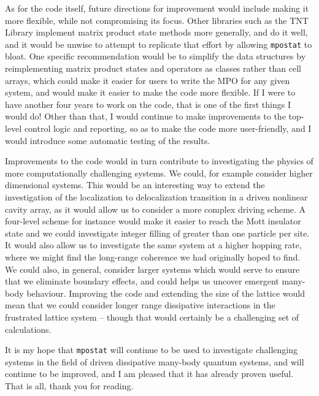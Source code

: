 As for the code itself, future directions for improvement would include making it more flexible, while not compromising its focus. Other libraries such as the TNT Library \cite{TNTlib,Al-Assam2017} implement matrix product state methods more generally, and do it well, and it would be unwise to attempt to replicate that effort by allowing \lstinline$mpostat$ to bloat. One specific recommendation would be to simplify the data structures by reimplementing matrix product states and operators as classes rather than cell arrays, which could make it easier for users to write the MPO for any given system, and would make it easier to make the code more flexible. If I were to have another four years to work on the code, that is one of the first things I would do! Other than that, I would continue to make improvements to the top-level control logic and reporting, so as to make the code more user-friendly, and I would introduce some automatic testing of the results. 

Improvements to the code would in turn contribute to investigating the physics of more computationally challenging systems. We could, for example consider higher dimensional systems. This would be an interesting way to extend the investigation of the localization to delocalization transition in a driven nonlinear cavity array, as it would allow us to consider a more complex driving scheme. A four-level scheme for instance would make it easier to reach the Mott insulator state and we could investigate integer filling of greater than one particle per site. It would also allow us to investigate the same system at a higher hopping rate, where we might find the long-range coherence we had originally hoped to find. We could also, in general, consider larger systems which would serve to ensure that we eliminate boundary effects, and could helps us uncover emergent many-body behaviour. Improving the code and extending the size of the lattice would mean that we could consider longer range dissipative interactions in the frustrated lattice system -- though that would certainly be a challenging set of calculations.

It is my hope that \lstinline$mpostat$ will continue to be used to investigate challenging systems in the field of driven dissipative many-body quantum systems, and will continue to be improved, and I am pleased that it has already proven useful. That is all, thank you for reading.